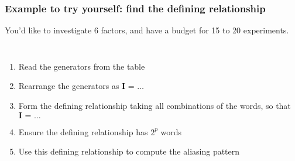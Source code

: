 \begin{frame}\frametitle{Example to try yourself: find the defining relationship}
	
	\vspace{0.5cm}
	You'd like to investigate 6 factors, and have a budget for 15 to 20 experiments.
	
	\vspace{0.5cm}
	\begin{columns}[T]
			\begin{enumerate}
				\item	Read the generators from the table 
				\item	Rearrange the generators as  $\textbf{I = \ldots}$
			 	\item	Form the {\color{purple}defining relationship} taking all combinations of the words, so that $\textbf{I = \ldots}$
			 	\item	Ensure the defining relationship has $2^p$ words
				\item	Use this defining relationship to compute the aliasing pattern
			\end{enumerate}
			

	\end{columns}

	
\end{frame}

